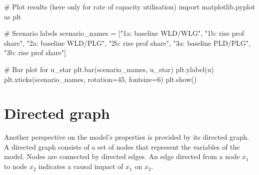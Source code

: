 \documentclass[
  letterpaper,
  DIV=11,
  numbers=noendperiod]{scrreprt}
\newenvironment{Shaded}{\begin{snugshade}}{\end{snugshade}}
\newcommand{\CommentTok}[1]{\textcolor[rgb]{0.37,0.37,0.37}{#1}}
\newcommand{\DecValTok}[1]{\textcolor[rgb]{0.68,0.00,0.00}{#1}}
\newcommand{\ImportTok}[1]{\textcolor[rgb]{0.00,0.46,0.62}{#1}}
\newcommand{\NormalTok}[1]{\textcolor[rgb]{0.00,0.23,0.31}{#1}}
\newcommand{\OperatorTok}[1]{\textcolor[rgb]{0.37,0.37,0.37}{#1}}
\newcommand{\StringTok}[1]{\textcolor[rgb]{0.13,0.47,0.30}{#1}}
\begin{document}
\begin{tcolorbox}[enhanced jigsaw, titlerule=0mm, breakable, bottomrule=.15mm, toprule=.15mm, colbacktitle=quarto-callout-note-color!10!white, rightrule=.15mm, toptitle=1mm, opacityback=0, left=2mm, coltitle=black, title=\textcolor{quarto-callout-note-color}{\faInfo}\hspace{0.5em}{Python code}, colframe=quarto-callout-note-color-frame, opacitybacktitle=0.6, leftrule=.75mm, bottomtitle=1mm, arc=.35mm, colback=white]

\begin{Shaded}
\begin{Highlighting}[]
\CommentTok{\# Plot results (here only for rate of capacity utilisation) }
\ImportTok{import}\NormalTok{ matplotlib.pyplot }\ImportTok{as}\NormalTok{ plt    }

\CommentTok{\# Scenario labels}
\NormalTok{scenario\_names }\OperatorTok{=}\NormalTok{ [}\StringTok{"1a: baseline WLD/WLG"}\NormalTok{, }\StringTok{"1b: rise prof share"}\NormalTok{, }\StringTok{"2a: baseline WLD/PLG"}\NormalTok{, }\StringTok{"2b: rise prof share"}\NormalTok{, }\StringTok{"3a: baseline PLD/PLG"}\NormalTok{, }\StringTok{"3b: rise prof share"}\NormalTok{]}

\CommentTok{\# Bar plot for u\_star}
\NormalTok{plt.bar(scenario\_names, u\_star)}
\NormalTok{plt.ylabel(}\StringTok{\textquotesingle{}u\textquotesingle{}}\NormalTok{)}
\NormalTok{plt.xticks(scenario\_names, rotation}\OperatorTok{=}\DecValTok{45}\NormalTok{, fontsize}\OperatorTok{=}\DecValTok{6}\NormalTok{)}
\NormalTok{plt.show()}
\end{Highlighting}
\end{Shaded}

\end{tcolorbox}

\section{Directed graph}\label{directed-graph-5}

Another perspective on the model's properties is provided by its
directed graph. A directed graph consists of a set of nodes that
represent the variables of the model. Nodes are connected by directed
edges. An edge directed from a node \(x_1\) to node \(x_2\) indicates a
causal impact of \(x_1\) on \(x_2\).
\end{document}
